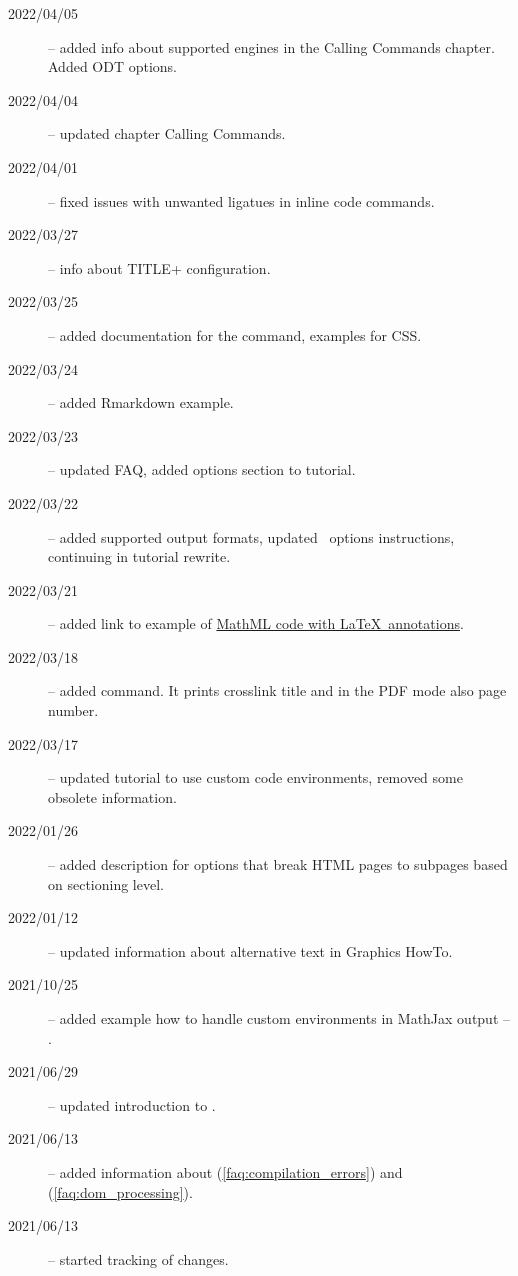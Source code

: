 \begin{description}
  \item[2022/04/05] -- added info about supported engines in the Calling Commands chapter. Added ODT options.
  \item[2022/04/04] -- updated chapter Calling Commands.
  \item[2022/04/01] -- fixed issues with unwanted ligatues in inline code commands.
  \item[2022/03/27] -- info about TITLE+ configuration.
  \item[2022/03/25] -- added documentation for the  command, examples for CSS.
  \item[2022/03/24] -- added Rmarkdown example.
  \item[2022/03/23] -- updated FAQ, added options section to tutorial.
  \item[2022/03/22] -- added supported output formats, updated \fourhtsty\ options instructions, continuing in tutorial rewrite.
  \item[2022/03/21] -- added link to example of \href{https://tex.stackexchange.com/a/637910/2891}{MathML code with \LaTeX\ annotations}.
  \item[2022/03/18] -- added \texcommand{\namerefpage} command. It prints crosslink title and in the PDF mode also page number.
  \item[2022/03/17] -- updated tutorial to use custom code environments, removed some obsolete information.
  \item[2022/01/26] -- added description for options that break HTML pages to subpages based on sectioning level.
  \item[2022/01/12] -- updated information about alternative text in Graphics HowTo.
  \item[2021/10/25] -- added example how to handle custom environments in MathJax output -- .
  \item[2021/06/29] -- updated introduction to .
  \item[2021/06/13] -- added information  about  (\ref{faq:compilation_errors}) and  (\ref{faq:dom_processing}).
  \item[2021/06/13] -- started tracking of changes.
\end{description}
